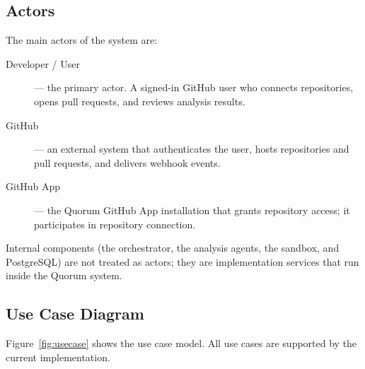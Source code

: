\subsection{Actors}

The main actors of the system are:

\begin{description}
  \item[Developer / User] --- the primary actor. A signed-in GitHub user who
        connects repositories, opens pull requests, and reviews analysis
        results.
  \item[GitHub] --- an external system that authenticates the user, hosts
        repositories and pull requests, and delivers webhook events.
  \item[GitHub App] --- the Quorum GitHub App installation that grants
        repository access; it participates in repository connection.
\end{description}

Internal components (the orchestrator, the analysis agents, the sandbox, and
PostgreSQL) are not treated as actors; they are implementation services that
run inside the Quorum system.

\subsection{Use Case Diagram}

Figure~\ref{fig:usecase} shows the use case model. All use cases are supported
by the current implementation.

